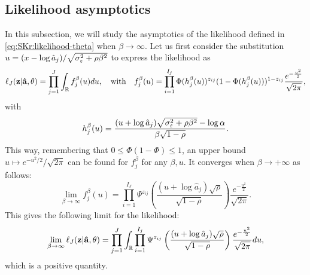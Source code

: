 \subsection{Likelihood asymptotics}
\label{subapp:C2}
    In this subsection, we will study the asymptotics of the likelihood defined in \cref{eq:SKr:likelihood-theta} when $\beta\to\infty$.
    Let us first consider the substitution $u=(x-\log\hat a_j)/\sqrt{\sigma_\varepsilon^2+\rho\beta^2}$ to express the likelihood as
    \begin{equation}
        \ell_J(\mathbf{z} | \mathbf{\hat a}, \theta) = \prod_{j=1}^J\int_{\mathbb{R}} f_{j}^\beta(u)du,
        \quad\text{with}\quad
        f_{j}^\beta(u) = \prod_{i=1}^{I_j}\Phi(h_j^\beta(u))^{z_{ij}}(1-\Phi(h_j^\beta(u)))^{1-z_{ij}} \frac{e^{-\frac{u^2}{2}}}{\sqrt{2\pi}} ,
    \end{equation}
    with 
    \begin{equation}
        h_j^\beta(u) = \frac{(u+\log\hat a_j)\sqrt{\sigma_\varepsilon^2+\rho\beta^2}-\log\alpha}{\beta\sqrt{1-\rho}}.
    \end{equation}
    This way, remembering that $0\leq\Phi(1-\Phi)\leq1$, an upper bound $u\mapsto e^{-u^2/2}/\sqrt{2\pi}$ can be found for $f_{j}^\beta$ for any $\beta,u$. It converges when $\beta \to +\infty$ as follows:
        \begin{equation}
            \lim_{\beta\rightarrow\infty} f_{j}^\beta(u)%
                = \prod_{i=1}^{I_J}%
                \Psi^{z_{ij}}\left(\frac{(u+\log\hat a_j)\sqrt{\rho}}{\sqrt{1-\rho}}\right)
                \frac{e^{-\frac{u^2}{2}}}{\sqrt{2\pi}}.
        \end{equation}
    This gives the following limit for the likelihood:
        \begin{equation}\label{eq:SKr:limitlik}
            \lim_{\beta\rightarrow\infty}\ell_J(\mbf z | \mbf{\hat a}, \theta)
                = \prod_{j=1}^J\int_\RR \prod_{i=1}^{I_j}%
                \Psi^{z_{ij}}\left(\frac{(u+\log\hat a_j)\sqrt{\rho}}{\sqrt{1-\rho}}\right)
                \frac{e^{-\frac{u^2}{2}}}{\sqrt{2\pi}}du ,
        \end{equation}
    which is a positive quantity.


